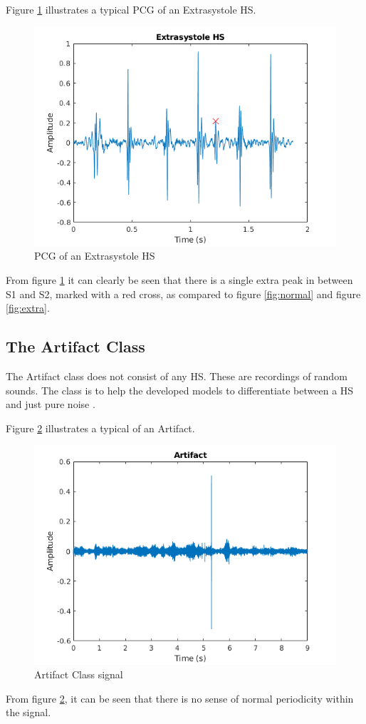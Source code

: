 \documentclass[10pt,twocolumn]{witseiepaper}
\begin{document}
Figure \ref{fig:extrasys} illustrates a typical PCG of an Extrasystole HS.
\begin{figure}[h!]
    \centering
    \includegraphics[scale = 0.45]{./extrasys.png}
    \caption{PCG of an Extrasystole HS}
    \label{fig:extrasys}
\end{figure}{}

From figure \ref{fig:extrasys} it can clearly be seen that there is a single extra peak in between S1 and S2, marked with a red cross, as compared to figure \ref{fig:normal} and figure \ref{fig:extra}.

\subsection*{The Artifact Class}
\label{sec:arti}
The Artifact class does not consist of any HS. These are recordings of random sounds. The class is to help the developed models to differentiate between a HS and just pure noise \cite{bentley}.

Figure \ref{fig:arti} illustrates a typical of an Artifact.
\begin{figure}[h!]
    \centering
    \includegraphics[scale = 0.45]{./arti.png}
    \caption{Artifact Class signal}
    \label{fig:arti}
\end{figure}{}

From figure \ref{fig:arti}, it can be seen that there is no sense of normal periodicity within the signal.
\end{document}
